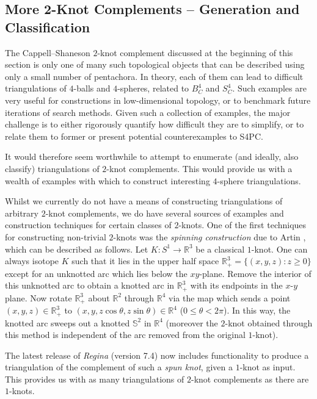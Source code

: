 \documentclass[pdflatex,sn-mathphys-num]{sn-jnl}
\theoremstyle{thmstyleone}%
\theoremstyle{thmstyletwo}%
\theoremstyle{thmstylethree}%
\theoremstyle{remark}
\begin{document}
\subsection{More 2-Knot Complements -- Generation and Classification}\label{sec:future-2knots}
The Cappell--Shaneson $2$-knot complement discussed at the beginning of this section is only one of many such topological objects that can be described using only a small number of pentachora. In theory, each of them can lead to difficult triangulations of $4$-balls and $4$-spheres, related to $B^4_C$ and $S^4_C$. Such examples are very useful for constructions in low-dimensional topology, or to benchmark future iterations of search methods. Given such a collection of examples, the major challenge is to either rigorously quantify how difficult they are to simplify, or to relate them to former or present potential counterexamples to S4PC. 

It would therefore seem worthwhile to attempt to enumerate (and ideally, also classify) triangulations of $2$-knot complements. This would provide us with a wealth of examples with which to construct interesting $4$-sphere triangulations.  

Whilst we currently do not have a means of constructing triangulations of arbitrary $2$-knot complements, we do have several sources of examples and construction techniques for certain classes of $2$-knots. One of the first techniques for constructing non-trivial $2$-knots was the \emph{spinning construction} due to Artin \cite{ArtinSpin}, which can be described as follows. Let $K:S^1\to\mathbb{R}^3$ be a classical $1$-knot. One can always isotope $K$ such that it lies in the upper half space $\mathbb{R}^3_+=\{(x,y,z):z\geq 0\}$ except for an unknotted arc which lies below the $xy$-plane. Remove the interior of this unknotted arc to obtain a knotted arc in $\mathbb{R}^3_+$ with its endpoints in the $x$-$y$ plane. Now rotate $\mathbb{R}^3_+$ about $\mathbb{R}^2$ through $\mathbb{R}^4$ via the map which sends a point $(x,y,z)\in\mathbb{R}^3_+$ to $(x,y,z\cos\theta,z\sin\theta)\in\mathbb{R}^4$ ($0\leq\theta< 2\pi$). In this way, the knotted arc sweeps out a knotted $\mathbb{S}^2$ in $\mathbb{R}^4$ (moreover the $2$-knot obtained through this method is independent of the arc removed from the original $1$-knot).

The latest release of \emph{Regina} (version 7.4) now includes functionality to produce a triangulation of the complement of such a {\em spun knot}, given a $1$-knot as input. This provides us with as many triangulations of $2$-knot complements as there are $1$-knots.  
\end{document}
